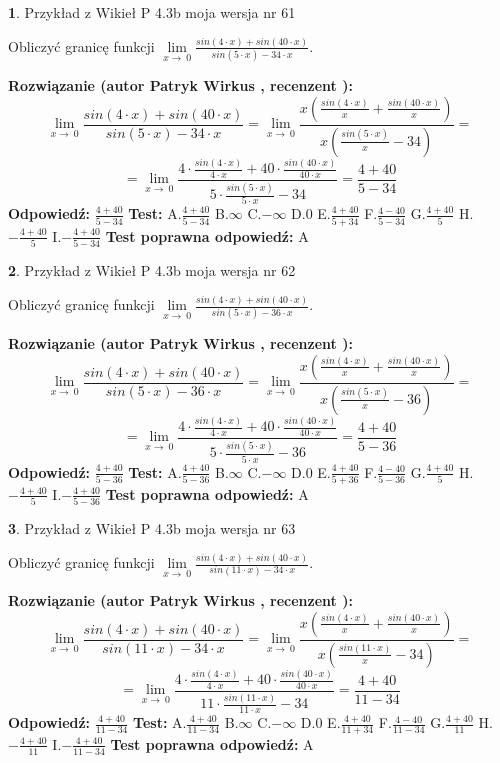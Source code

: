 \documentclass[12pt, a4paper]{article}
\theoremstyle{definition} %
\newtheorem{zad}{}
\newcommand{\zadStart}[1]{\begin{zad}#1\newline}
\newcommand{\zadStop}{\end{zad}}
\newcommand{\rozwStart}[2]{\noindent \textbf{Rozwiązanie (autor #1 , recenzent #2): }\newline}
\newcommand{\rozwStop}{\newline}
\newcommand{\odpStart}{\noindent \textbf{Odpowiedź:}\newline}
\newcommand{\odpStop}{\newline}
\newcommand{\testStart}{\noindent \textbf{Test:}\newline}
\newcommand{\testStop}{\newline}
\newcommand{\kluczStart}{\noindent \textbf{Test poprawna odpowiedź:}\newline}
\newcommand{\kluczStop}{\newline}
\begin{document}
\zadStart{Przykład z Wikieł P 4.3b moja wersja nr 61}


Obliczyć granicę funkcji $\lim\limits_{x\to\ 0}\frac{sin(4 \cdot x)+sin(40 \cdot x)}{sin(5 \cdot x)-34 \cdot x}$.
\zadStop
\rozwStart{Patryk Wirkus}{}
$$\lim\limits_{x\to\ 0}\frac{sin(4 \cdot x)+sin(40 \cdot x)}{sin(5 \cdot x)-34 \cdot x}=\lim\limits_{x\to\ 0}\frac{x(\frac{sin(4 \cdot x)}{x}+\frac{sin(40 \cdot x)}{x})}{x(\frac{sin(5 \cdot x)}{x}-34)}=$$
$$=\lim\limits_{x\to\ 0}\frac{4 \cdot \frac{sin(4 \cdot x)}{4 \cdot x}+40 \cdot \frac{sin(40 \cdot x)}{40 \cdot x}}{5 \cdot \frac{sin(5 \cdot x)}{5 \cdot x}-34}=\frac{4+40}{5-34}$$
\rozwStop
\odpStart
$\frac{4+40}{5-34}$
\odpStop
\testStart
A.$\frac{4+40}{5-34}$
B.$\infty$
C.$-\infty$
D.$0$
E.$\frac{4+40}{5+34}$
F.$\frac{4-40}{5-34}$
G.$\frac{4+40}{5}$
H.$-\frac{4+40}{5}$
I.$-\frac{4+40}{5-34}$
\testStop
\kluczStart
A
\kluczStop



\zadStart{Przykład z Wikieł P 4.3b moja wersja nr 62}


Obliczyć granicę funkcji $\lim\limits_{x\to\ 0}\frac{sin(4 \cdot x)+sin(40 \cdot x)}{sin(5 \cdot x)-36 \cdot x}$.
\zadStop
\rozwStart{Patryk Wirkus}{}
$$\lim\limits_{x\to\ 0}\frac{sin(4 \cdot x)+sin(40 \cdot x)}{sin(5 \cdot x)-36 \cdot x}=\lim\limits_{x\to\ 0}\frac{x(\frac{sin(4 \cdot x)}{x}+\frac{sin(40 \cdot x)}{x})}{x(\frac{sin(5 \cdot x)}{x}-36)}=$$
$$=\lim\limits_{x\to\ 0}\frac{4 \cdot \frac{sin(4 \cdot x)}{4 \cdot x}+40 \cdot \frac{sin(40 \cdot x)}{40 \cdot x}}{5 \cdot \frac{sin(5 \cdot x)}{5 \cdot x}-36}=\frac{4+40}{5-36}$$
\rozwStop
\odpStart
$\frac{4+40}{5-36}$
\odpStop
\testStart
A.$\frac{4+40}{5-36}$
B.$\infty$
C.$-\infty$
D.$0$
E.$\frac{4+40}{5+36}$
F.$\frac{4-40}{5-36}$
G.$\frac{4+40}{5}$
H.$-\frac{4+40}{5}$
I.$-\frac{4+40}{5-36}$
\testStop
\kluczStart
A
\kluczStop



\zadStart{Przykład z Wikieł P 4.3b moja wersja nr 63}


Obliczyć granicę funkcji $\lim\limits_{x\to\ 0}\frac{sin(4 \cdot x)+sin(40 \cdot x)}{sin(11 \cdot x)-34 \cdot x}$.
\zadStop
\rozwStart{Patryk Wirkus}{}
$$\lim\limits_{x\to\ 0}\frac{sin(4 \cdot x)+sin(40 \cdot x)}{sin(11 \cdot x)-34 \cdot x}=\lim\limits_{x\to\ 0}\frac{x(\frac{sin(4 \cdot x)}{x}+\frac{sin(40 \cdot x)}{x})}{x(\frac{sin(11 \cdot x)}{x}-34)}=$$
$$=\lim\limits_{x\to\ 0}\frac{4 \cdot \frac{sin(4 \cdot x)}{4 \cdot x}+40 \cdot \frac{sin(40 \cdot x)}{40 \cdot x}}{11 \cdot \frac{sin(11 \cdot x)}{11 \cdot x}-34}=\frac{4+40}{11-34}$$
\rozwStop
\odpStart
$\frac{4+40}{11-34}$
\odpStop
\testStart
A.$\frac{4+40}{11-34}$
B.$\infty$
C.$-\infty$
D.$0$
E.$\frac{4+40}{11+34}$
F.$\frac{4-40}{11-34}$
G.$\frac{4+40}{11}$
H.$-\frac{4+40}{11}$
I.$-\frac{4+40}{11-34}$
\testStop
\kluczStart
A
\kluczStop
\end{document}
